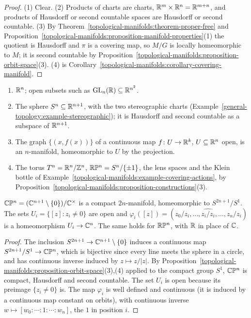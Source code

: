 \begin{proof}
(1) Clear. (2) Products of charts are charts, $\mathbb{R}^m \times \mathbb{R}^n = \mathbb{R}^{m+n}$, and products of Hausdorff or second countable spaces are Hausdorff or second countable. (3) By
Theorem~\ref{topological-manifolds:theorem-proper-free} and Proposition~\ref{topological-manifolds:proposition-manifold-properties}(1) the quotient is Hausdorff and $\pi$ is a covering map, so $M/G$ is locally homeomorphic to
$M$; it is second countable by Proposition~\ref{topological-manifolds:proposition-orbit-space}(3). (4) is Corollary~\ref{topological-manifolds:corollary-covering-manifold}.
\end{proof}

\begin{example}\label{topological-manifolds:example-manifolds}
\begin{enumerate}
\item $\mathbb{R}^n$; open subsets such as $\mathrm{GL}_n(\mathbb{R}) \subseteq \mathbb{R}^{n^2}$.
\item The sphere $S^n \subseteq \mathbb{R}^{n+1}$, with the two stereographic charts (Example~\ref{general-topology:example-stereographic}); it is Hausdorff and second countable as a subspace of $\mathbb{R}^{n+1}$.
\item The graph $\{(x, f(x))\}$ of a continuous map $f \colon U \to \mathbb{R}^k$, $U \subseteq \mathbb{R}^n$ open, is an $n$-manifold, homeomorphic to $U$ by the projection.
\item The torus $T^n = \mathbb{R}^n/\mathbb{Z}^n$, $\mathbb{R}\mathbb{P}^n = S^n/\{\pm1\}$, the lens spaces and the Klein bottle of Example~\ref{topological-manifolds:example-covering-actions}, by Proposition~\ref{topological-manifolds:proposition-constructions}(3).
\end{enumerate}
\end{example}

\begin{proposition}\label{topological-manifolds:proposition-projective-spaces}
$\mathbb{C}\mathbb{P}^n = (\mathbb{C}^{n+1} \setminus \{0\})/\mathbb{C}^\times$ is a compact $2n$-manifold, homeomorphic to $S^{2n+1}/S^1$. The sets $U_i = \{[z] : z_i \neq 0\}$ are open and $\varphi_i([z]) = (z_0/z_i, \ldots, \widehat{z_i/z_i}, \ldots, z_n/z_i)$ is a
homeomorphism $U_i \to \mathbb{C}^n$. The same holds for $\mathbb{R}\mathbb{P}^n$, with $\mathbb{R}$ in place of $\mathbb{C}$.
\end{proposition}

\begin{proof}
The inclusion $S^{2n+1} \to \mathbb{C}^{n+1} \setminus \{0\}$ induces a continuous map $S^{2n+1}/S^1 \to \mathbb{C}\mathbb{P}^n$, which is bijective since every line meets the sphere in a circle, and has continuous inverse induced by
$z \mapsto z/|z|$. By Proposition~\ref{topological-manifolds:proposition-orbit-space}(3),(4) applied to the compact group $S^1$, $\mathbb{C}\mathbb{P}^n$ is compact, Hausdorff and second countable. The set $U_i$ is open because its preimage
$\{z_i \neq 0\}$ is. The map $\varphi_i$ is well defined and continuous (it is induced by a continuous map constant on orbits), with continuous inverse $w \mapsto [w_0 : \cdots : 1 : \cdots : w_n]$, the $1$ in position $i$.
\end{proof}


